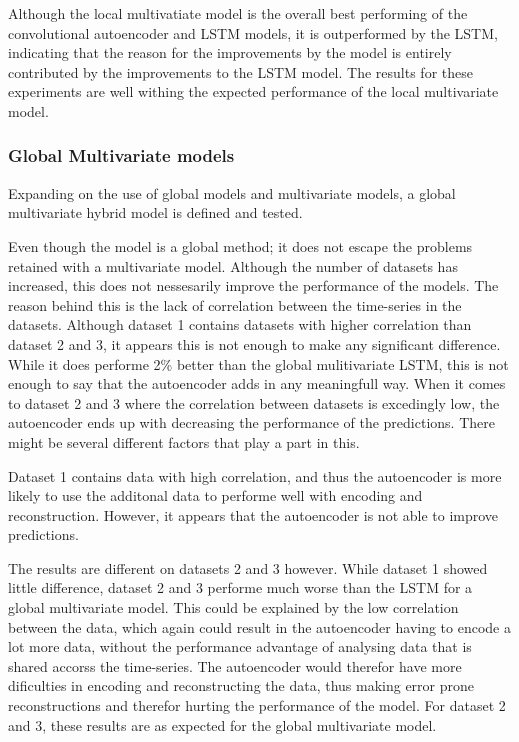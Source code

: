 Although the local multivatiate model is the overall best performing of the convolutional autoencoder and LSTM models,
it is outperformed by the LSTM, indicating that the reason for the improvements by the model
is entirely contributed by the improvements to the LSTM model.
The results for these experiments are well withing the expected performance of the local multivariate model.





\subsubsection{Global Multivariate models}

Expanding on the use of global models and multivariate models,
a global multivariate hybrid model is defined and tested.

Even though the model is a global method; it does not escape the problems retained with a multivariate model.
Although the number of datasets has increased, this does not nessesarily improve the performance of the models.
The reason behind this is the lack of correlation between the time-series in the datasets.
Although dataset 1 contains datasets with higher correlation than dataset 2 and 3, it appears this is not enough to make any significant difference.
While it does performe 2\% better than the global mulitivariate LSTM, this is not enough to say that the autoencoder adds
in any meaningfull way.
When it comes to dataset 2 and 3 where the correlation between datasets is excedingly low, the autoencoder ends up with decreasing the performance of the predictions.
There might be several different factors that play a part in this.

Dataset 1 contains data with high correlation, and thus the autoencoder is more likely to use the additonal data to performe well with encoding and reconstruction.
However, it appears that the autoencoder is not able to improve predictions.


The results are different on datasets 2 and 3 however.
While dataset 1 showed little difference, dataset 2 and 3 performe much worse than the LSTM for a global multivariate model.
This could be explained by the low correlation between the data, which again could result in the autoencoder having to encode a lot more data,
without the performance advantage of analysing data that is shared accorss the time-series.
The autoencoder would therefor have more dificulties in encoding and reconstructing the data,
thus making error prone reconstructions and therefor hurting the performance of the model.
For dataset 2 and 3, these results are as expected for the global multivariate model.



